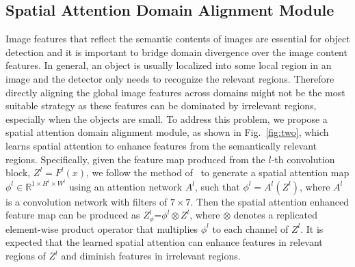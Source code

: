 \documentclass[runningheads]{llncs}
\begin{document}
\subsection{Spatial Attention Domain Alignment Module}

Image features that reflect the semantic contents of images
are essential for object detection and it is important to bridge domain divergence 
over the image content features.
In general, an object is usually localized into some local region in an image
and the detector only needs to recognize the relevant regions.
Therefore directly aligning the global image features across domains might not 
be the most suitable strategy as these features can be dominated by irrelevant regions,
especially when the objects are small.
To address this problem, we propose a spatial attention domain alignment module,
as shown in Fig.~\ref{fig:two},  
which learns spatial attention to enhance features from the semantically relevant regions. 
Specifically, given the feature map produced from the $l$-th convolution block, $Z^l=F^l(x)$, 
we follow the method of~\cite{WooCBAM} to generate a spatial attention map $\phi^l\in\mathbb{R}^{1\times H^l\times W^l}$ 
using an attention network $A^l$, such that 
$\phi^l = {A}^l(Z^l)$, where ${A}^l$ is 
a convolution network with filters of $7 \times7$.
Then the spatial attention enhanced feature map can be produced as 
$Z^l_\phi$=$\phi^l \otimes Z^l$, where $\otimes$ denotes a replicated element-wise product operator 
that multiplies $\phi^l$ to each channel of $Z^l$.
It is expected that the learned spatial attention can enhance features in relevant regions of $Z^l$
and diminish features in irrelevant regions.
\end{document}
